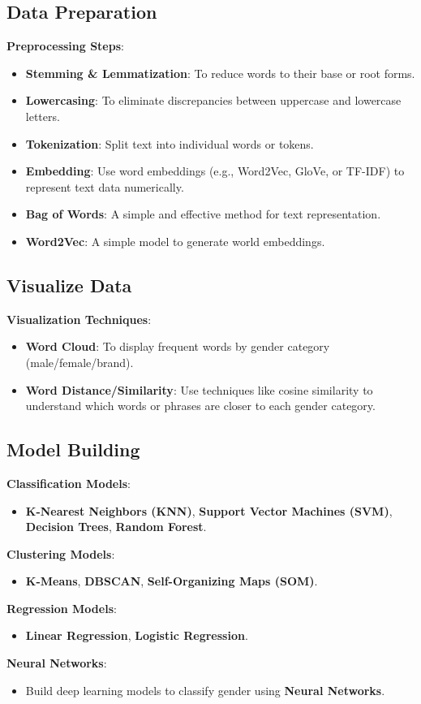 \documentclass[a4paper,11pt]{article}
\begin{document}
\subsection{Data Preparation}
\textbf{Preprocessing Steps}:
\begin{itemize}
    \item \textbf{Stemming \& Lemmatization}: To reduce words to their base or root forms.
    \item \textbf{Lowercasing}: To eliminate discrepancies between uppercase and lowercase letters.
    \item \textbf{Tokenization}: Split text into individual words or tokens.
    \item \textbf{Embedding}: Use word embeddings (e.g., Word2Vec, GloVe, or TF-IDF) to represent text data numerically.
    \item \textbf{Bag of Words}: A simple and effective method for text representation.
    \item \textbf{Word2Vec}: A simple model to generate world embeddings.
\end{itemize}

\subsection{Visualize Data}
\textbf{Visualization Techniques}:
\begin{itemize}
    \item \textbf{Word Cloud}: To display frequent words by gender category (male/female/brand).
    \item \textbf{Word Distance/Similarity}: Use techniques like cosine similarity to understand which words or phrases are closer to each gender category.
\end{itemize}

\subsection{Model Building}
\textbf{Classification Models}:
\begin{itemize}
    \item \textbf{K-Nearest Neighbors (KNN)}, \textbf{Support Vector Machines (SVM)}, \textbf{Decision Trees}, \textbf{Random Forest}.
\end{itemize}
\textbf{Clustering Models}:
\begin{itemize}
    \item \textbf{K-Means}, \textbf{DBSCAN}, \textbf{Self-Organizing Maps (SOM)}.
\end{itemize}
\textbf{Regression Models}:
\begin{itemize}
    \item \textbf{Linear Regression}, \textbf{Logistic Regression}.
\end{itemize}
\textbf{Neural Networks}:
\begin{itemize}
    \item Build deep learning models to classify gender using \textbf{Neural Networks}.
\end{itemize}
\end{document}
